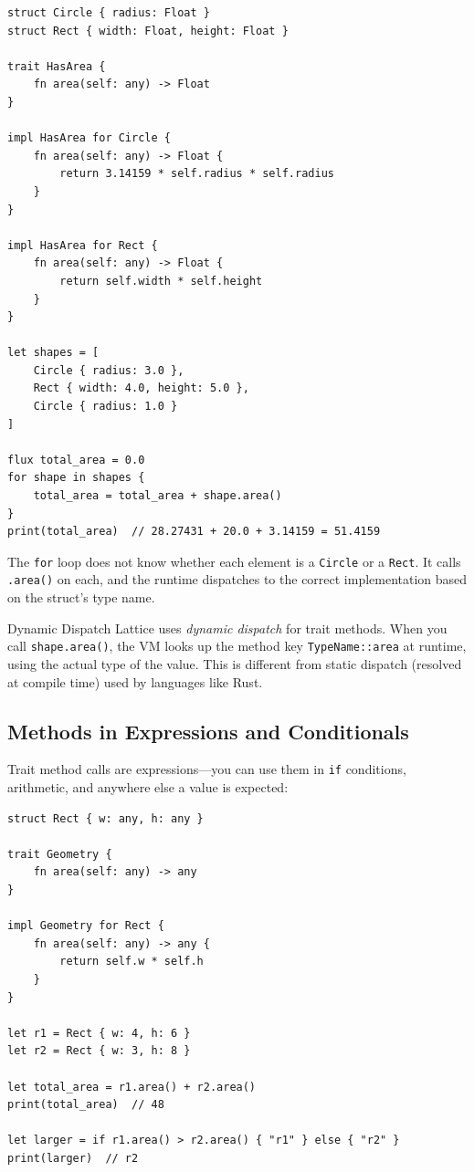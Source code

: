 \begin{lstlisting}[language=Lattice, caption={Polymorphic dispatch over an array}]
struct Circle { radius: Float }
struct Rect { width: Float, height: Float }

trait HasArea {
    fn area(self: any) -> Float
}

impl HasArea for Circle {
    fn area(self: any) -> Float {
        return 3.14159 * self.radius * self.radius
    }
}

impl HasArea for Rect {
    fn area(self: any) -> Float {
        return self.width * self.height
    }
}

let shapes = [
    Circle { radius: 3.0 },
    Rect { width: 4.0, height: 5.0 },
    Circle { radius: 1.0 }
]

flux total_area = 0.0
for shape in shapes {
    total_area = total_area + shape.area()
}
print(total_area)  // 28.27431 + 20.0 + 3.14159 = 51.4159
\end{lstlisting}

The \lstinline|for| loop does not know whether each element is a
\lstinline|Circle| or a \lstinline|Rect|. It calls \lstinline|.area()|
on each, and the runtime dispatches to the correct implementation based
on the struct's type name.

\begin{defnbox}{Dynamic Dispatch}
Lattice uses \emph{dynamic dispatch} for trait methods. When you call
\lstinline|shape.area()|, the VM looks up the method key
\texttt{TypeName::area} at runtime, using the actual type of the value.
This is different from static dispatch (resolved at compile time) used by
languages like Rust.
\end{defnbox}

\subsection{Methods in Expressions and Conditionals}

Trait method calls are expressions---you can use them in \lstinline|if|
conditions, arithmetic, and anywhere else a value is expected:

\begin{lstlisting}[language=Lattice, caption={Methods in expressions}]
struct Rect { w: any, h: any }

trait Geometry {
    fn area(self: any) -> any
}

impl Geometry for Rect {
    fn area(self: any) -> any {
        return self.w * self.h
    }
}

let r1 = Rect { w: 4, h: 6 }
let r2 = Rect { w: 3, h: 8 }

let total_area = r1.area() + r2.area()
print(total_area)  // 48

let larger = if r1.area() > r2.area() { "r1" } else { "r2" }
print(larger)  // r2
\end{lstlisting}


